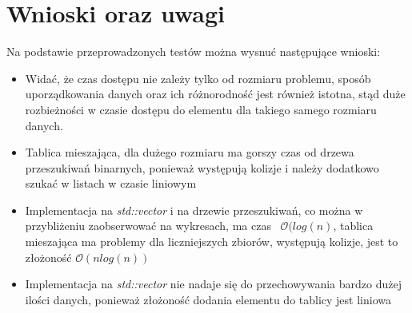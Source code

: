 \documentclass[10pt,a4paper]{article}
\begin{document}
\section{Wnioski oraz uwagi}

Na podstawie przeprowadzonych testów można wysnuć następujące wnioski:
\begin{itemize}
\item Widać, że czas dostępu nie zależy tylko od rozmiaru problemu, sposób uporządkowania
danych oraz ich różnorodność jest również istotna, stąd duże rozbieżności w czasie dostępu
do elementu dla takiego samego rozmiaru danych.
\item Tablica mieszająca, dla dużego rozmiaru ma gorszy czas od drzewa przeszukiwań binarnych,
ponieważ występują kolizje i należy dodatkowo szukać w listach w czasie liniowym
\item Implementacja na \textit{std::vector} i na drzewie przeszukiwań, co można
w przybliżeniu zaobserwować na wykresach, ma czas ~$\mathcal{O}(log(n)$,
tablica mieszająca ma problemy dla liczniejszych zbiorów, występują kolizje, jest to złożoność
$\mathcal{O}(nlog(n))$
\item Implementacja na \textit{std::vector} nie nadaje się do przechowywania bardzo dużej ilości
danych, ponieważ złożoność dodania elementu do tablicy jest liniowa
\end{itemize}
\end{document}
